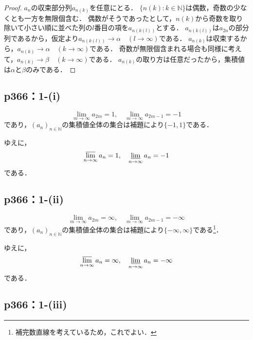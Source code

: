 \documentclass[a4paper,10pt,fleqn]{ltjsarticle}
\begin{document}
\begin{proof}
$a_n$の収束部分列$a_{n(k)}$を任意にとる．
$\{n(k):k \in \mathbb{N}\}$は偶数，奇数の少なくとも一方を無限個含む．
偶数がそうであったとして，$n(k)$から奇数を取り除いて小さい順に並べた列の$l$番目の項を$a_{n(k(l))}$とする．
$a_{n(k(l))}$は$a_{2n}$の部分列であるから，仮定より$a_{n(k(l))} \to \alpha \quad (l \to \infty)$である．
$a_{n(k)}$は収束するから，$a_{n(k)} \to \alpha \quad (k \to \infty)$である．
奇数が無限個含まれる場合も同様に考えて，$a_{n(k)} \to \beta \quad (k \to \infty)$である．
$a_{n(k)}$の取り方は任意だったから，集積値は$\alpha$と$\beta$のみである．
\end{proof}

\subsection*{p366：1-(i)}

\begin{tleftbar}
    \[
        \lim_{m \to \infty} a_{2m} = 1 , \quad \lim_{m \to \infty} a_{2m-1} = -1
    \]
    であり，$(a_n)_{n \in \mathbb{N}}$の集積値全体の集合は補題により$\{ -1 , 1 \}$である．

    ゆえに，
    \[
        \varlimsup_{n \to \infty} a_n = 1 , \quad \varliminf_{n \to \infty} a_n =-1
    \]
    である．
\end{tleftbar}


\subsection*{p366：1-(ii)}

\begin{tleftbar}
    \[
        \lim_{m \to \infty} a_{2m} = \infty , \quad \lim_{m \to \infty} a_{2m-1} = -\infty
    \]
    であり，$(a_n)_{n \in \mathbb{N}}$の集積値全体の集合は補題により$\{ -\infty , \infty \}$である\footnote{補完数直線を考えているため，これでよい．}．

    ゆえに，
    \[
        \varlimsup_{n \to \infty} a_n = \infty , \quad \varliminf_{n \to \infty} a_n =-\infty 
    \]
    である．
\end{tleftbar}

\subsection*{p366：1-(iii)}
\end{document}
